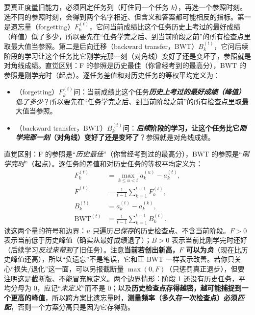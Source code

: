 要真正度量旧能力，必须固定任务列（盯住同一个任务 $k$），再选一个参照时刻。选不同的参照时刻，会得到两个名字相近、但含义和答案都可能相反的指标。第一是遗忘量（forgetting）$F_k^{(t)}$，它问当前成绩比这个任务历史上考过的最好成绩（峰值）低了多少，所以要先在“任务学完之后、到当前阶段之前”的所有检查点里取最大值当参照。第二是后向迁移（backward transfer，BWT）$B_k^{(t)}$，它问后续阶段的学习让这个任务比它刚学完那一刻（对角线）变好了还是变坏了，参照就是对角线成绩。直觉区别：F 的参照是历史最佳（你曾经考到的最高分），BWT 的参照是刚学完时（起点）。逐任务差值和对历史任务的等权平均定义为：
\begin{itemize}\item {}（forgetting）$F_k^{(t)}$问：当前成绩比这个任务\textbf{\emph{历史上\emph{考过的最好成绩}（峰值）}}\emph{低了多少}？所以要先在“任务学完之后、到当前阶段之前”的所有检查点里取最大值当参照。\item {}（backward transfer，BWT）$B_k^{(t)}$问：\textbf{\emph{后续}阶段的学习，让这个任务比它\emph{刚学完那一刻}（对角线）变好了还是变坏了}？参照就是对角线成绩。\end{itemize}
直觉区别：F 的参照是“\emph{历史最佳}”（你曾经考到过的最高分），BWT 的参照是“\emph{刚学完时}”（起点）。逐任务的差值和对历史任务的等权平均定义为：
\begin{equation}
  \begin{aligned}
    F_k^{(t)}&=\max_{k\leq u<t}a_k^{(u)}-a_k^{(t)},\\
    \bar F^{(t)}&=\frac1{t-1}\sum_{k=1}^{t-1}F_k^{(t)},\\
    B_k^{(t)}&=a_k^{(t)}-a_k^{(k)},\\
    \operatorname{BWT}^{(t)}&=\frac1{t-1}\sum_{k=1}^{t-1}B_k^{(t)}.
  \end{aligned}
  \label{eq:ket-evaluation-forgetting-bwt}
\end{equation}
读这两个量的符号和边界：$u$ 只遍历\emph{已保存}的历史检查点、不含当前阶段。$F>0$ 表示当前低于历史峰值（确实从最好成绩退了）；$B>0$ 表示当前比刚学完时还好（后续学习\emph{反过来帮到}了旧任务）。注意\textbf{当前若创出新高，$F$ 可以为\emph{负}}（现在比历史峰值还高），所以“负遗忘”不是笔误，它和正 BWT 一样表示改善。若你只关心“损失/退化”这一面，可以另报截断量 $\max(0,F)$（只惩罚真正退步），但要注明这是截断版、不能冒充原定义。两个边界情形：阶段 1 还没有历史任务，平均分母为 0，应记“\emph{未定义}”而不是 0；以及\textbf{历史检查点存得越密，越可能捕捉到一个更高的峰值}，所以跨方案比遗忘量时，\textbf{测量频率（多久存一次检查点）必须\emph{匹配}}，否则一个方案分高只是因为它存得勤。

